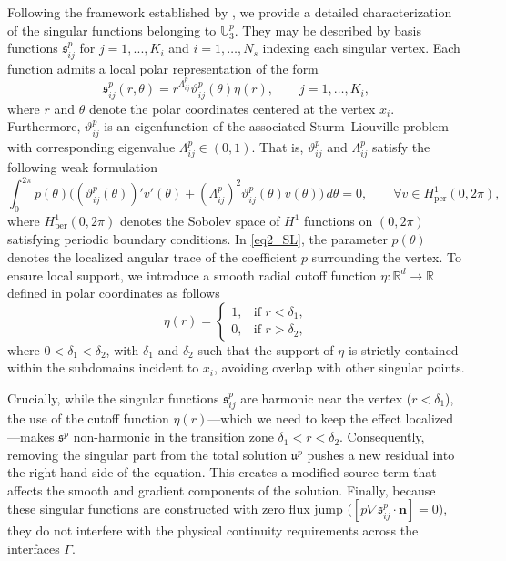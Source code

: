 \documentclass[oneside]{article}
\newcounter{reviewer}
\newcounter{point}[reviewer]
\begin{document}
\noindent Following the framework established by \cite{kellogg1971singularities}, we provide a detailed characterization of the singular functions belonging to $\mathbb{U}^p_3$. They may be described by basis functions $\mathfrak{s}^p_{ij}$ for $j=1,...,K_i$ and $i=1,\ldots, N_s$ indexing each singular vertex. Each function admits a local polar representation of the form
\begin{equation}\label{eq2_sij definition}
\mathfrak{s}^p_{ij}(r, \theta)=r^{\Lambda^p_{ij}}\vartheta^p_{ij}(\theta)\eta (r), \qquad j = 1, \ldots, K_i,
\end{equation}
where $r$ and $\theta$ denote the polar coordinates centered at the vertex $x_i$. Furthermore, $\vartheta^p_{ij}$ is an eigenfunction of the associated Sturm–Liouville problem with corresponding eigenvalue $\Lambda^p_{ij} \in (0, 1)$. That is, $\vartheta^p_{ij}$ and $\Lambda^p_{ij}$ satisfy the following weak formulation
\begin{equation}\label{eq2_SL}
\int_0 ^{2\pi} p(\theta)\Big((\vartheta^p _{ij}(\theta))'v'(\theta) + (\Lambda^p _{ij})^2 \vartheta^p _{ij} (\theta) v(\theta)\big) \, d \theta = 0, \qquad \forall v \in H^1_{\text{per}}(0, 2\pi),
\end{equation}
where $H^1_{\text{per}}(0, 2\pi)$ denotes the Sobolev space of $H^1$ functions on $(0, 2\pi)$ satisfying periodic boundary conditions. In \eqref{eq2_SL}, the parameter $p(\theta)$ denotes the localized angular trace of the coefficient $p$ surrounding the vertex. To ensure local support, we introduce a smooth radial cutoff function $\eta: \mathbb{R}^d \to \mathbb{R}$ defined in polar coordinates as follows
\begin{equation}\label{eq2_eta}
    \eta(r) = \begin{cases} 
    1, & \text{if } r < \delta_1, \\ 
    0, & \text{if } r > \delta_2, 
    \end{cases}
\end{equation}
where $0 < \delta_1 < \delta_2$, with $\delta_1$ and $\delta_2$ such that the support of $\eta$ is strictly contained within the subdomains incident to $x_i$, avoiding overlap with other singular points.

\noindent Crucially, while the singular functions $\mathfrak{s}_{ij}^p$ are harmonic near the vertex ($r < \delta_1$), the use of the cutoff function $\eta(r)$—which we need to keep the effect localized—makes $\mathfrak{s}^p$ non-harmonic in the transition zone $\delta_1 < r < \delta_2$. Consequently, removing the singular part from the total solution $\mathfrak{u}^p$ pushes a new residual into the right-hand side of the equation. This creates a modified source term that affects the smooth and gradient components of the solution. Finally, because these singular functions are constructed with zero flux jump ($[ p \nabla \mathfrak{s}^p_{ij} \cdot \mathbf{n} ] = 0$), they do not interfere with the physical continuity requirements across the interfaces $\Gamma$.
\end{document}
